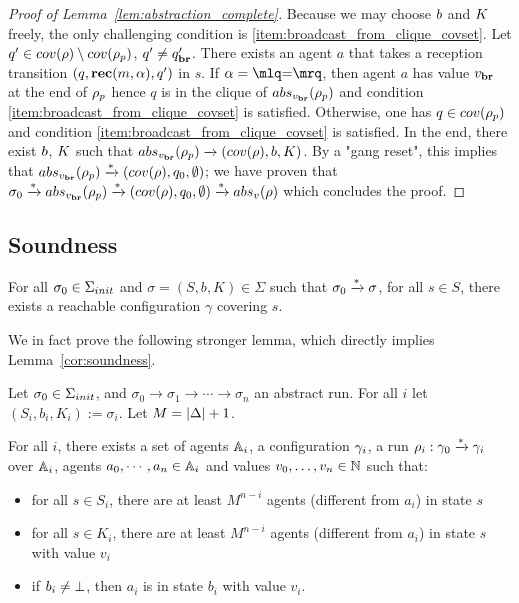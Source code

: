 \begin{proof}[Proof of Lemma~\ref{lem:abstraction_complete}]
	Because we may choose $\boss$ and $\clique$ freely, the only challenging condition is \ref{item:broadcast_from_clique_covset}.
	Let $q' \in \statesin{\run} \setminus \statesin{\run_p}$, $q' \ne q_{\textbf{br}}'$. 
	There exists an agent $a$ that takes a reception transition $(q,\textbf{rec}(m, \alpha),q')$ in $s$. 
	If $\anact = \quotemarks{\eqtestact}$, then agent $a$ has value $v_{\textbf{br}}$ at the end of $\rho_p$ hence $q$ is in the clique of $\absproj{\avalbr}{\run_p}$ and condition \ref{item:broadcast_from_clique_covset} is satisfied. Otherwise, one has $q \in \statesin{\run_p}$ and condition \ref{item:broadcast_from_clique_covset} is satisfied.
	In the end, there exist $\boss$, $\clique$ such that $\absproj{\avalbr}{\run_p} \step{} (\statesin{\run}, \boss,\clique)$. By a "gang reset", this implies that $\absproj{\avalbr}{\run_p} \step{*} (\statesin{\run}, q_0, \emptyset)$; we have proven that $\aconfiginit \step{*}\absproj{\avalbr}{\run_p} \step{*} (\statesin{\run}, q_0, \emptyset) \step{*} \absproj{\aval}{\run}$ which concludes the proof. 
\end{proof}


\subsection{Soundness}
\label{sec:one-soundness}

\begin{lemma}
	\label{cor:soundness}
	For all $\sigma_0 \in \aconfiginitset$ and $\sigma = (S, b, K) \in \Sigma$ such that $\sigma_0 \xrightarrow{*} \sigma$, for all $s \in S$, there exists a reachable configuration $\gamma$ covering $s$.
\end{lemma}


We in fact prove the following stronger lemma, which directly implies Lemma~\ref{cor:soundness}.

\begin{lemma}
	\label{lem:correctness-construction}
	
	
	Let $\sigma_0 \in \aconfiginitset$, and $\sigma_0 \to \sigma_1 \to \cdots \to \sigma_n$ an abstract run. For all $i$ let $(S_i, b_i, K_i) := \sigma_i$. Let $M = |\Delta|+1$.
	
	For all $i$, there exists a set of agents $\mathbb{A}_i$, a configuration $\gamma_i$, a run $\rho_i : \gamma_0 \xrightarrow{*} \gamma_i$ over $\mathbb{A}_i$, agents $a_0, \cdots, a_n \in \mathbb{A}_i$ and values $v_0, \ldots, v_n \in \mathbb{N}$ such that:
	\begin{itemize}
		\item for all $s \in S_i$, there are at least $M^{n-i}$ agents (different from $a_i$) in state $s$ 
		
		\item for all $s \in K_i$, there are at least $M^{n-i}$ agents (different from $a_i$) in state $s$ with value $v_i$
		
		\item if $b_i \neq \bot$, then $a_i$ is in state $b_i$ with value $v_i$.
	\end{itemize}
\end{lemma}

